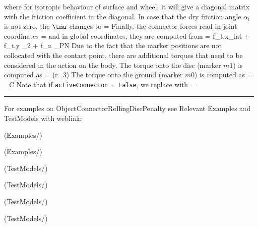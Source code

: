     \ee
    where for isotropic behaviour of surface and wheel, it will give a diagonal matrix with the friction coefficient in the diagonal.
    In case that the dry friction angle $\alpha_t$ is not zero, the $\tmu$ changes to
    \be
       =  
    \ee
    Finally, the connector forces read in joint coordinates
    \be \label{eq:ConnectorRollingDiscPenalty:forces}
       = 
    \ee
    and in global coordinates, they are computed from
    \be
       = f_{t,x}_{lat} + f_{t,y} _2 + f_n _{PN}
    \ee
    Due to the fact that the marker positions are not collocated with the contact point, 
    there are additional torques that need to be considered in the action on the body.
    The torque onto the disc (marker $m1$) is computed as
    \be
       = (r\cdot {}_3) \times {}
    \ee
    The torque onto the ground (marker $m0$) is computed as
    \be
       = _{C} \times {}
    \ee
    Note that if \texttt{activeConnector = False}, we replace  with
    \be
       = \Null
    \ee
\vspace{6pt}\par\noindent\rule{\textwidth}{0.4pt}
%
\noindent For examples on ObjectConnectorRollingDiscPenalty see Relevant Examples and TestModels with weblink:
\bi
\item {} (Examples/)
\item {} (Examples/)
\item {} (TestModels/)
\item {} (TestModels/)
\item {} (TestModels/)
\item {} (TestModels/)

